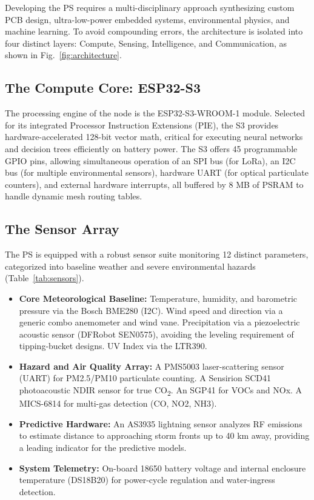 \documentclass[conference]{IEEEtran}
\begin{document}
Developing the PS requires a multi-disciplinary approach synthesizing
custom PCB design, ultra-low-power embedded systems, environmental
physics, and machine learning. To avoid compounding errors, the
architecture is isolated into four distinct layers: Compute, Sensing,
Intelligence, and Communication, as shown in Fig.~\ref{fig:architecture}.

\subsection{The Compute Core: ESP32-S3}
\label{subsec:compute}

The processing engine of the node is the ESP32-S3-WROOM-1 module. Selected
for its integrated Processor Instruction Extensions (PIE), the S3 provides
hardware-accelerated 128-bit vector math, critical for executing neural
networks and decision trees efficiently on battery power. The S3 offers 45
programmable GPIO pins, allowing simultaneous operation of an SPI bus (for
LoRa), an I2C bus (for multiple environmental sensors), hardware UART (for
optical particulate counters), and external hardware interrupts, all
buffered by 8 MB of PSRAM to handle dynamic mesh routing tables.

\subsection{The Sensor Array}
\label{subsec:sensors}

The PS is equipped with a robust sensor suite monitoring 12 distinct
parameters, categorized into baseline weather and severe environmental
hazards (Table~\ref{tab:sensors}).

\begin{itemize}
    \item \textbf{Core Meteorological Baseline:} Temperature, humidity, and
    barometric pressure via the Bosch BME280 (I2C). Wind speed and
    direction via a generic combo anemometer and wind vane. Precipitation via a
    piezoelectric acoustic sensor (DFRobot SEN0575), avoiding the leveling
    requirement of tipping-bucket designs. UV Index via the LTR390.
    \item \textbf{Hazard and Air Quality Array:} A PMS5003 laser-scattering
    sensor (UART) for PM2.5/PM10 particulate counting. A Sensirion SCD41
    photoacoustic NDIR sensor for true CO\textsubscript{2}. An SGP41 for
    VOCs and NOx. A MICS-6814 for multi-gas detection (CO, NO2, NH3).
    \item \textbf{Predictive Hardware:} An AS3935 lightning sensor analyzes
    RF emissions to estimate distance to approaching storm fronts up to 40
    km away, providing a leading indicator for the predictive models.
    \item \textbf{System Telemetry:} On-board 18650 battery voltage and
    internal enclosure temperature (DS18B20) for power-cycle regulation
    and water-ingress detection.
\end{itemize}
\end{document}
